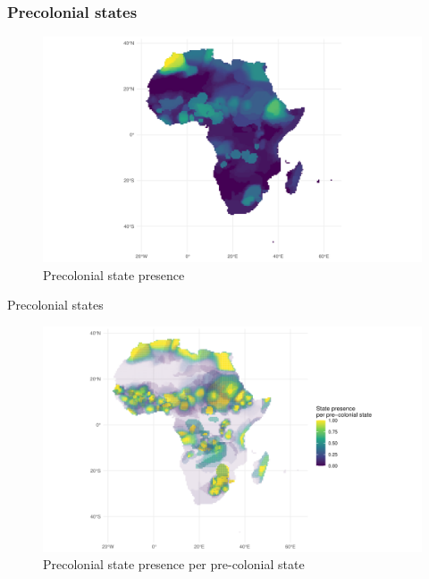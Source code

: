 \documentclass{beamer}
\begin{document}
\begin{frame}
\frametitle{Precolonial states} 

\begin{figure}[htpb]
	\centering
	\includegraphics[width=\linewidth]{../R/Output/sqrtSpAll.pdf}
	\caption{Precolonial state presence}%
	\label{sp}
\end{figure}
\end{frame}

\begin{frame}{Precolonial states}
\begin{figure}[htpb]
	\centering
	\includegraphics[width=\linewidth]{img/geo_isd_all.png}
	\caption{Precolonial state presence per pre-colonial state}%
\end{figure}
\end{frame}
\end{document}
